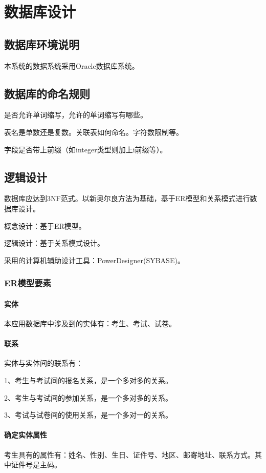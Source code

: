 \chapter{数据库设计}
\section{数据库环境说明}
本系统的数据系统采用Oracle数据库系统。


\section{数据库的命名规则}
是否允许单词缩写，允许的单词缩写有哪些。

表名是单数还是复数。关联表如何命名。字符数限制等。

字段是否带上前缀（如integer类型则加上i前缀等）。

\section{逻辑设计}
数据库应达到3NF范式。以新奥尔良方法为基础，基于ER模型和关系模式进行数据库设计。

概念设计：基于ER模型。

逻辑设计：基于关系模式设计。

采用的计算机辅助设计工具：PowerDesigner(SYBASE)。

\subsection{ER模型要素}

\subsubsection{实体}
本应用数据库中涉及到的实体有：考生、考试、试卷。

\subsubsection{联系}
实体与实体间的联系有：

1、考生与考试间的报名关系，是一个多对多的关系。

2、考生与考试间的参加关系，是一个多对多的关系。

3、考试与试卷间的使用关系，是一个多对一的关系。

\subsubsection{确定实体属性}
考生具有的属性有：姓名、性别、生日、证件号、地区、邮寄地址、联系方式。其中证件号是主码。

